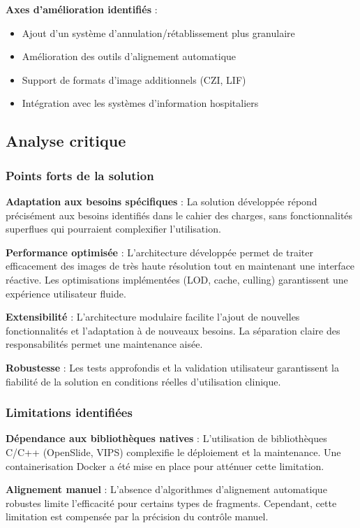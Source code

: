 \documentclass[12pt,a4paper]{report}
\begin{document}
\textbf{Axes d'amélioration identifiés} :
\begin{itemize}
\item Ajout d'un système d'annulation/rétablissement plus granulaire
\item Amélioration des outils d'alignement automatique
\item Support de formats d'image additionnels (CZI, LIF)
\item Intégration avec les systèmes d'information hospitaliers
\end{itemize}

\subsection{Analyse critique}

\subsubsection{Points forts de la solution}

\textbf{Adaptation aux besoins spécifiques} : La solution développée répond précisément aux besoins identifiés dans le cahier des charges, sans fonctionnalités superflues qui pourraient complexifier l'utilisation.

\textbf{Performance optimisée} : L'architecture développée permet de traiter efficacement des images de très haute résolution tout en maintenant une interface réactive. Les optimisations implémentées (LOD, cache, culling) garantissent une expérience utilisateur fluide.

\textbf{Extensibilité} : L'architecture modulaire facilite l'ajout de nouvelles fonctionnalités et l'adaptation à de nouveaux besoins. La séparation claire des responsabilités permet une maintenance aisée.

\textbf{Robustesse} : Les tests approfondis et la validation utilisateur garantissent la fiabilité de la solution en conditions réelles d'utilisation clinique.

\subsubsection{Limitations identifiées}

\textbf{Dépendance aux bibliothèques natives} : L'utilisation de bibliothèques C/C++ (OpenSlide, VIPS) complexifie le déploiement et la maintenance. Une containerisation Docker a été mise en place pour atténuer cette limitation.

\textbf{Alignement manuel} : L'absence d'algorithmes d'alignement automatique robustes limite l'efficacité pour certains types de fragments. Cependant, cette limitation est compensée par la précision du contrôle manuel.
\end{document}
